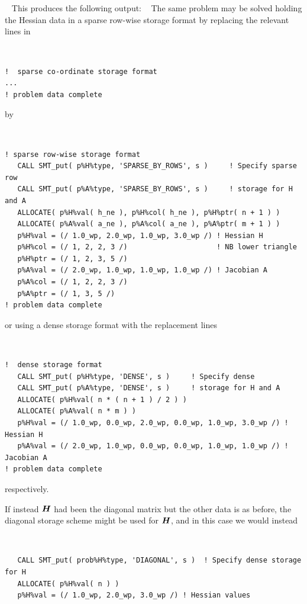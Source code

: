 \documentclass{galahad}
\begin{document}
{\tt \small
\VerbatimInput{\packageexample}
}
\noindent
This produces the following output:
{\tt \small
\VerbatimInput{\packageresults}
}
\noindent
The same problem may be solved holding the Hessian data in
a sparse row-wise storage format by replacing the relevant lines in
{\tt \small
\begin{verbatim}
!  sparse co-ordinate storage format
...
! problem data complete
\end{verbatim}
}
\noindent
by
{\tt \small
\begin{verbatim}
! sparse row-wise storage format
   CALL SMT_put( p%H%type, 'SPARSE_BY_ROWS', s )     ! Specify sparse row
   CALL SMT_put( p%A%type, 'SPARSE_BY_ROWS', s )     ! storage for H and A
   ALLOCATE( p%H%val( h_ne ), p%H%col( h_ne ), p%H%ptr( n + 1 ) )
   ALLOCATE( p%A%val( a_ne ), p%A%col( a_ne ), p%A%ptr( m + 1 ) )
   p%H%val = (/ 1.0_wp, 2.0_wp, 1.0_wp, 3.0_wp /) ! Hessian H
   p%H%col = (/ 1, 2, 2, 3 /)                     ! NB lower triangle
   p%H%ptr = (/ 1, 2, 3, 5 /)
   p%A%val = (/ 2.0_wp, 1.0_wp, 1.0_wp, 1.0_wp /) ! Jacobian A
   p%A%col = (/ 1, 2, 2, 3 /)
   p%A%ptr = (/ 1, 3, 5 /)
! problem data complete
\end{verbatim}
}
\noindent
or using a dense storage format with the replacement lines
{\tt \small
\begin{verbatim}
!  dense storage format
   CALL SMT_put( p%H%type, 'DENSE', s )     ! Specify dense
   CALL SMT_put( p%A%type, 'DENSE', s )     ! storage for H and A
   ALLOCATE( p%H%val( n * ( n + 1 ) / 2 ) )
   ALLOCATE( p%A%val( n * m ) )
   p%H%val = (/ 1.0_wp, 0.0_wp, 2.0_wp, 0.0_wp, 1.0_wp, 3.0_wp /) ! Hessian H
   p%A%val = (/ 2.0_wp, 1.0_wp, 0.0_wp, 0.0_wp, 1.0_wp, 1.0_wp /) ! Jacobian A
! problem data complete
\end{verbatim}
}
\noindent
respectively.

If instead ${\bm{H}}$ had been the diagonal matrix
but the other data is as before, the diagonal storage scheme
might be used for ${\bm{H}}$, and in this case we would instead
{\tt \small
\begin{verbatim}
   CALL SMT_put( prob%H%type, 'DIAGONAL', s )  ! Specify dense storage for H
   ALLOCATE( p%H%val( n ) )
   p%H%val = (/ 1.0_wp, 2.0_wp, 3.0_wp /) ! Hessian values
\end{verbatim}
}
\noindent
\end{document}
